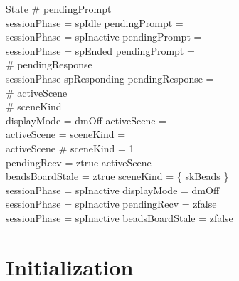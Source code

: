 \documentclass[a4paper,10pt,fleqn]{article}
\begin{document}
\begin{schema}{State}
  \# pendingPrompt  \\
  sessionPhase = spIdle \implies pendingPrompt = \emptyset \\
  sessionPhase = spInactive \implies pendingPrompt = \emptyset \\
  sessionPhase = spEnded \implies pendingPrompt = \emptyset \\
  \# pendingResponse  \\
  sessionPhase \neq spResponding \implies pendingResponse = \emptyset \\
  \# activeScene  \\
  \# sceneKind  \\
  displayMode = dmOff \implies activeScene = \emptyset \\
  activeScene = \emptyset \implies sceneKind = \emptyset \\
  activeScene \neq \emptyset \implies \# sceneKind = 1 \\
  pendingRecv = ztrue \implies activeScene \neq \emptyset \\
  beadsBoardStale = ztrue \implies sceneKind = \{ skBeads \} \\
  sessionPhase = spInactive \implies displayMode = dmOff \\
  sessionPhase = spInactive \implies pendingRecv = zfalse \\
  sessionPhase = spInactive \implies beadsBoardStale = zfalse
\end{schema}

\section{Initialization}
\end{document}
